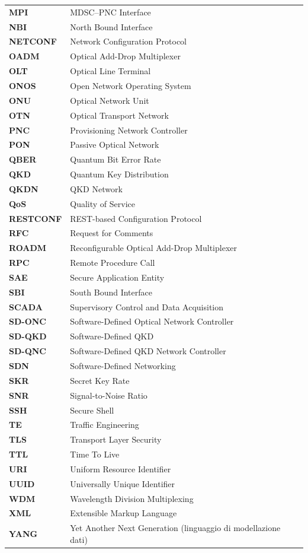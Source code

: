 \begin{longtable}{@{}p{2.6cm}p{12.6cm}@{}}
\textbf{MPI} & MDSC--PNC Interface \\
\textbf{NBI} & North Bound Interface \\
\textbf{NETCONF} & Network Configuration Protocol \\
\textbf{OADM} & Optical Add-Drop Multiplexer \\
\textbf{OLT} & Optical Line Terminal \\
\textbf{ONOS} & Open Network Operating System \\
\textbf{ONU} & Optical Network Unit \\
\textbf{OTN} & Optical Transport Network \\
\textbf{PNC} & Provisioning Network Controller \\
\textbf{PON} & Passive Optical Network \\
\textbf{QBER} & Quantum Bit Error Rate \\
\textbf{QKD} & Quantum Key Distribution \\
\textbf{QKDN} & QKD Network \\
\textbf{QoS} & Quality of Service \\
\textbf{RESTCONF} & REST-based Configuration Protocol \\
\textbf{RFC} & Request for Comments \\
\textbf{ROADM} & Reconfigurable Optical Add-Drop Multiplexer \\
\textbf{RPC} & Remote Procedure Call \\
\textbf{SAE} & Secure Application Entity \\
\textbf{SBI} & South Bound Interface \\
\textbf{SCADA} & Supervisory Control and Data Acquisition \\
\textbf{SD-ONC} & Software-Defined Optical Network Controller \\
\textbf{SD-QKD} & Software-Defined QKD \\
\textbf{SD-QNC} & Software-Defined QKD Network Controller \\
\textbf{SDN} & Software-Defined Networking \\
\textbf{SKR} & Secret Key Rate \\
\textbf{SNR} & Signal-to-Noise Ratio \\
\textbf{SSH} & Secure Shell \\
\textbf{TE} & Traffic Engineering \\
\textbf{TLS} & Transport Layer Security \\
\textbf{TTL} & Time To Live \\
\textbf{URI} & Uniform Resource Identifier \\
\textbf{UUID} & Universally Unique Identifier \\
\textbf{WDM} & Wavelength Division Multiplexing \\
\textbf{XML} & Extensible Markup Language \\
\textbf{YANG} & Yet Another Next Generation (linguaggio di modellazione dati) \\
\end{longtable}
